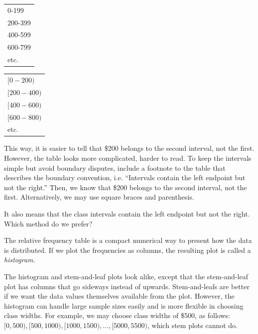 \documentclass[11pt, chapterprefix=true]{scrbook}\usepackage[]{graphicx}\usepackage[]{color}
\begin{document}
\begin{minipage}[ht]{6cm}

\begin{tabular}{@{} l @{}} \hline
0-199 \\
200-399 \\
400-599 \\
600-799 \\
etc. \\ \hline
\end{tabular}

\end{minipage}
\begin{minipage}[ht]{6cm}

\begin{tabular}{@{} l @{}} \hline
$ [0-200)$ \\
$ [200-400)$ \\
$ [400-600)$ \\
$ [600-800)$ \\
 etc. \\ \hline
\end{tabular}
\end{minipage}

This way, it is easier to tell that \$200 belongs to the second interval, not the first.  However, the table looks more complicated, harder to read.  To keep the intervals simple but avoid boundary disputes, include a footnote to the table that describes the boundary convention, i.e. ``Intervals contain the left endpoint but not the right.''  Then, we know that \$200 belongs to the second interval, not the first.  Alternatively, we may use square braces and parenthesis.

It also means that the class intervals contain the left endpoint but not the right.  Which method do we prefer?

The relative frequency table is a compact numerical way to present how the data is distributed.  If we plot the frequencies as columns, the resulting plot is called a \textit{histogram}.

The histogram and stem-and-leaf plots look alike, except that the stem-and-leaf plot has columns that go sideways instead of upwards.  Stem-and-leafs are better if we want the data values themselves available from the plot.  However, the histogram can handle large sample sizes easily and is more flexible in choosing class widths.  For example, we may choose class widths of \$500, as follows: $[0,500), [500,1000), [1000,1500), \dots, [5000,5500)$, which stem plots cannot do.
\end{document}
